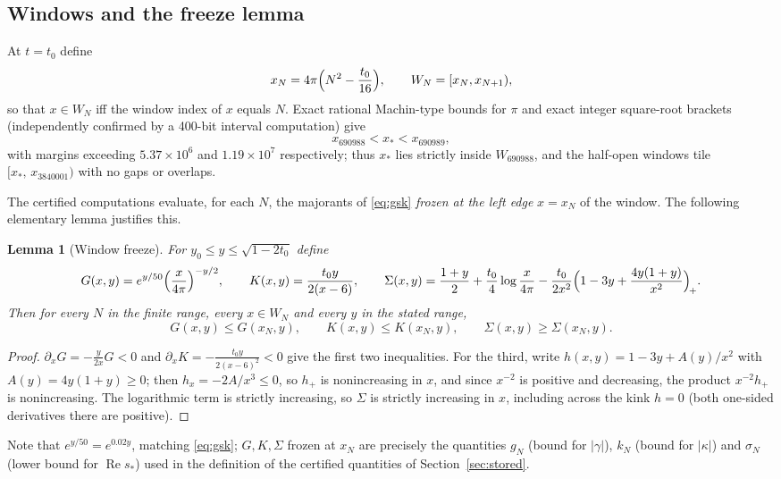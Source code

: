 \documentclass[11pt]{article}
\newtheorem{lemma}[theorem]{Lemma}
\theoremstyle{definition}
\DeclareMathOperator{\Rea}{Re}
\begin{document}
\subsection{Windows and the freeze lemma}\label{sec:freeze}

At $t=t_0$ define
\[
x_N=4\pi\Bigl(N^2-\frac{t_0}{16}\Bigr),
\qquad
W_N=[x_N,x_{N+1}),
\]
so that $x\in W_N$ iff the window index of $x$ equals $N$. Exact
rational Machin-type bounds for $\pi$ and exact integer square-root
brackets (independently confirmed by a 400-bit interval computation)
give
\begin{equation}\label{eq:xstarwindow}
x_{690988}<x_*<x_{690989},
\end{equation}
with margins exceeding $5.37\times10^6$ and $1.19\times10^7$
respectively; thus $x_*$ lies strictly inside $W_{690988}$, and the
half-open windows tile $[x_*,\,x_{3840001})$ with no gaps or overlaps.

The certified computations evaluate, for each $N$, the majorants of
\eqref{eq:gsk} \emph{frozen at the left edge} $x=x_N$ of the window.
The following elementary lemma justifies this.

\begin{lemma}[Window freeze]\label{lem:freeze}
For $y_0\le y\le\sqrt{1-2t_0}$ define
\[
G(x,y)=e^{y/50}\Bigl(\frac{x}{4\pi}\Bigr)^{-y/2},
\qquad
K(x,y)=\frac{t_0y}{2(x-6)},
\qquad
\Sigma(x,y)=\frac{1+y}{2}+\frac{t_0}{4}\log\frac{x}{4\pi}
-\frac{t_0}{2x^2}\Bigl(1-3y+\frac{4y(1+y)}{x^2}\Bigr)_{\!+}.
\]
Then for every $N$ in the finite range, every $x\in W_N$ and every $y$
in the stated range,
\[
G(x,y)\le G(x_N,y),\qquad
K(x,y)\le K(x_N,y),\qquad
\Sigma(x,y)\ge\Sigma(x_N,y).
\]
\end{lemma}

\begin{proof}
$\partial_xG=-\frac{y}{2x}G<0$ and
$\partial_xK=-\frac{t_0y}{2(x-6)^2}<0$ give the first two
inequalities. For the third, write
$h(x,y)=1-3y+A(y)/x^2$ with $A(y)=4y(1+y)\ge0$; then
$h_x=-2A/x^3\le0$, so $h_+$ is nonincreasing in $x$, and since
$x^{-2}$ is positive and decreasing, the product $x^{-2}h_+$ is
nonincreasing. The logarithmic term is strictly increasing, so
$\Sigma$ is strictly increasing in $x$, including across the kink
$h=0$ (both one-sided derivatives there are positive).
\end{proof}

Note that $e^{y/50}=e^{0.02y}$, matching \eqref{eq:gsk}; $G,K,\Sigma$
frozen at $x_N$ are precisely the quantities $g_N$ (bound for
$|\gamma|$), $k_N$ (bound for $|\kappa|$) and $\sigma_N$ (lower bound
for $\Rea s_*$) used in the definition of the certified quantities of Section~\ref{sec:stored}.
\end{document}
